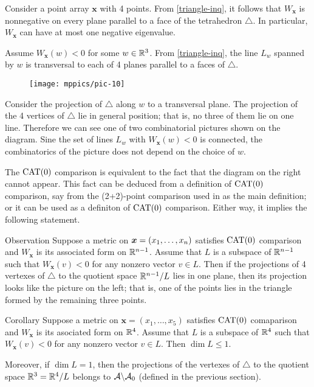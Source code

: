 \documentclass{article}
\begin{document}
Consider a point array $\bm{x}$ with 4 points.
From \ref{triangle-inq}, 
it follows that $W_{\bm{x}}$ 
is nonnegative on every plane parallel to a face of the tetrahedron $\triangle$.
In particular, $W_{\bm{x}}$ can have at most one negative eigenvalue.

Assume $W_{\bm{x}}(w)<0$ for some $w\in\mathbb{R}^3$.
From \ref{triangle-inq}, the line $L_w$ spanned by
$w$ is transversal to each of 4 planes parallel to a faces of $\triangle$.

\begin{wrapfigure}{r}{33mm}
\vskip-4mm
\centering
\texttt{[image: mppics/pic-10]}
\end{wrapfigure}

Consider the projection of $\triangle$ along $w$ to a transversal plane. 
The projection of the 4 vertices of $\triangle$ lie in general position; 
that is, no three of them lie on one line.
Therefore  we can see one of two combinatorial pictures shown on the diagram.
Sine the set of lines $L_w$ with $W_{\bm{x}}(w)<0$ is connected,
the combinatorics of the picture does not depend on the choice of $w$.

The $\mathrm{CAT}(0)$ comparison is equivalent to the fact that the diagram on the right cannot appear.
This fact can be deduced from a definition of $\mathrm{CAT}(0)$ comparison,
say from the (2+2)-point comparison used in \cite{alexander-kapovitch-petrunin} as the main definition;
or it can be used as a definiton of $\mathrm{CAT}(0)$ comparison.
Either way, it implies the following statement.


\begin{thm}{Observation}\label{cat0-proj}
Suppose a metric on $\bm{x}\z=(x_1,\dots,x_n)$ satisfies $\mathrm{CAT}(0)$ comparison
and $W_{\bm{x}}$ is its associated form on $\mathbb{R}^{n-1}$.
Assume that $L$ is a subspace of $\mathbb{R}^{n-1}$ such that
$W_{\bm{x}}(v)< 0$ for any nonzero vector $v\in L$.
Then if the projections of 4 vertexes of $\triangle$ to the quotient space $\mathbb{R}^{n-1}/L$ lies in one plane, then its projection looks like the picture on the left;
that is, one of the points lies in the triangle formed by the remaining three points.
\end{thm}

\begin{thm}{Corollary}\label{cor:3+2}
Suppose a metric on $\bm{x}=(x_1,\dots,x_5)$ satisfies $\mathrm{CAT}(0)$ comaparison
and $W_{\bm{x}}$ is its asociated form on $\mathbb{R}^{4}$.
Assume that $L$ is a subspace of $\mathbb{R}^{4}$ such that
$W_{\bm{x}}(v)< 0$ for any nonzero vector $v\in L$.
Then $\dim L\le 1$.

Moreover, if $\dim L= 1$, then the projections of the vertexes of $\triangle$ to the quotient space $\mathbb{R}^3=\mathbb{R}^4/L$ belongs to $\mathcal{A}\backslash\mathcal{A}_0$ (defined in the previous section). 
\end{thm}
\end{document}
